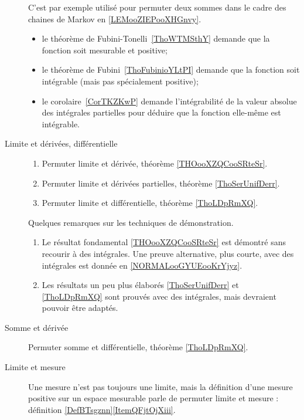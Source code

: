 \begin{description}
        C'est par exemple utilisé pour permuter deux sommes dans le cadre des chaines de Markov en \ref{LEMooZIEPooXHGnvy}.
\begin{itemize}
    \item
        le théorème de Fubini-Tonelli~\ref{ThoWTMSthY} demande que la fonction soit mesurable et positive;
    \item
        le théorème de Fubini~\ref{ThoFubinioYLtPI} demande que la fonction soit intégrable (mais pas spécialement positive);
    \item
        le corolaire~\ref{CorTKZKwP} demande l'intégrabilité de la valeur absolue des intégrales partielles pour déduire que la fonction elle-même est intégrable.
\end{itemize}

\item[Limite et dérivées, différentielle]
    \begin{enumerate}
        \item
            Permuter limite et dérivée, théorème \ref{THOooXZQCooSRteSr}.
        \item
 Permuter limite et dérivées partielles, théorème \ref{ThoSerUnifDerr}.
        \item
            Permuter limite et différentielle, théorème \ref{ThoLDpRmXQ}.
    \end{enumerate}
    Quelques remarques sur les techniques de démonstration.
    \begin{enumerate}
        \item
            Le résultat fondamental \ref{THOooXZQCooSRteSr} est démontré sans recourir à des intégrales. Une preuve alternative, plus courte, avec des intégrales est donnée en \ref{NORMALooGYUEooKrYjyz}.
        \item
            Les résultats un peu plus élaborés \ref{ThoSerUnifDerr} et \ref{ThoLDpRmXQ} sont prouvés avec des intégrales, mais devraient pouvoir être adaptés.
    \end{enumerate}
\item[Somme et dérivée]
    Permuter somme et différentielle, théorème \ref{ThoLDpRmXQ}.
\item[Limite et mesure]
    Une mesure n'est pas toujours une limite, mais la définition d'une mesure positive sur un espace mesurable parle de permuter limite et mesure : définition \ref{DefBTsgznn}\ref{ItemQFjtOjXiii}.

\end{description}


